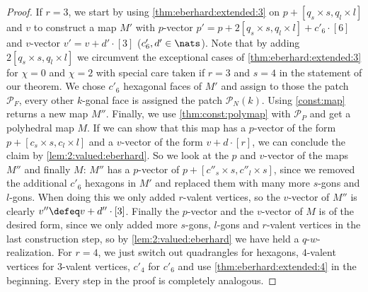 \begin{proposition}
\begin{proof}
    If $r = 3$, we start by using \autoref{thm:eberhard:extended:3} on $p + [q_s \times s, q_l \times l]$ and $v$ to construct a map $M'$ with $p$-vector $p' = p + 2[q_s \times s, q_l \times l] + c'_6 \cdot [6]$ and $v$-vector $v' = v + d' \cdot [3]$ ($c'_6, d' \in \nats$). Note that by adding $2[q_s \times s, q_l \times l]$ we circumvent the exceptional cases of \autoref{thm:eberhard:extended:3} for $\chi = 0$ and $\chi = 2$ with special care taken if $r = 3$ and $s = 4$ in the statement of our theorem. We chose $c'_6$ hexagonal faces of $M'$ and assign to those the patch $\mathcal{P}_F$, every other $k$-gonal face is assigned the patch $\mathcal{P}_N(k)$. Using \autoref{const:map} returns a new map $M''$. Finally, we use \autoref{thm:const:polymap} with $\mathcal{P}_P$ and get a polyhedral map $M$. If we can show that this map has a $p$-vector of the form $p +  [c_s \times s, c_l \times l]$ and a $v$-vector of the form $v + d \cdot [r]$, we can conclude the claim by \autoref{lem:2:valued:eberhard}. So we look at the $p$ and $v$-vector of the maps $M''$ and finally $M$: $M''$ has a $p$-vector of $p + [c''_s \times s, c''_l \times s]$, since we removed the additional $c'_6$ hexagons in $M'$ and replaced them with many more $s$-gons and $l$-gons. When doing this we only added $r$-valent vertices, so the $v$-vector of $M''$ is clearly $v'' \defeq v + d'' \cdot [3]$. Finally the $p$-vector and the $v$-vector of $M$ is of the desired form, since we only added more $s$-gons, $l$-gons and $r$-valent vertices in the last construction step, so by \autoref{lem:2:valued:eberhard} we have held a $q$-$w$-realization. For $r = 4$, we just switch out quadrangles for hexagons, $4$-valent vertices for $3$-valent vertices, $c'_4$ for $c'_6$ and use \autoref{thm:eberhard:extended:4} in the beginning. Every step in the proof is completely analogous.
  \end{proof}
\end{proposition}

\begin{remark}
\end{remark}